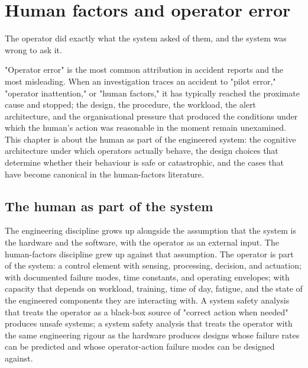 \chapter{Human factors and operator error}
\label{vol10:ch09}

\epigraph{The operator did exactly what the system asked of them, and the system was wrong to ask it.}{}


\noindent
"Operator error" is the most common attribution in accident reports and the most misleading. When an investigation traces an accident to "pilot error," "operator inattention," or "human factors," it has typically reached the proximate cause and stopped; the design, the procedure, the workload, the alert architecture, and the organisational pressure that produced the conditions under which the human's action was reasonable in the moment remain unexamined. This chapter is about the human as part of the engineered system: the cognitive architecture under which operators actually behave, the design choices that determine whether their behaviour is safe or catastrophic, and the cases that have become canonical in the human-factors literature.

\section{The human as part of the system}

The engineering discipline grows up alongside the assumption that the system is the hardware and the software, with the operator as an external input. The human-factors discipline grew up against that assumption. The operator is part of the system: a control element with sensing, processing, decision, and actuation; with documented failure modes, time constants, and operating envelopes; with capacity that depends on workload, training, time of day, fatigue, and the state of the engineered components they are interacting with. A system safety analysis that treats the operator as a black-box source of "correct action when needed" produces unsafe systems; a system safety analysis that treats the operator with the same engineering rigour as the hardware produces designs whose failure rates can be predicted and whose operator-action failure modes can be designed against.


